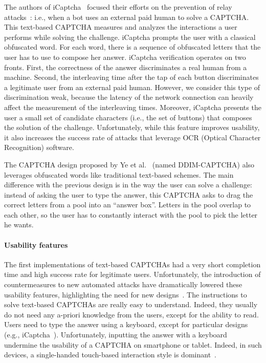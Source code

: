 \documentclass[conference]{IEEEtran}
\begin{document}
The authors of iCaptcha~\cite{truong2011iCAPTCHA} focused their efforts on the prevention of relay attacks~\cite{motoyama2010re}:
i.e., when a bot uses an external paid human to solve a CAPTCHA. This text-based CAPTCHA measures and analyzes the interactions a user performs while solving the challenge. 
iCaptcha prompts the user with a classical obfuscated word. For each word, there is a sequence of obfuscated letters that the user has to use to compose her answer.
iCaptcha verification operates on two fronts. 
First, the correctness of the answer discriminates a real human from a machine. 
Second, the interleaving time after the tap of each button discriminates a legitimate user from an external paid human.
However, we consider this type of discrimination weak, because the latency of the network connection can heavily affect the measurement of the interleaving times.
Moreover, iCaptcha presents the user a small set of candidate characters (i.e., the set of buttons) that  composes the solution of the challenge.
Unfortunately, while this feature  improves usability, it also increases the success rate of attacks that leverage OCR (Optical Character Recognition) software. 

The CAPTCHA design proposed by Ye et al.~\cite{ye2013ddim} (named DDIM-CAPTCHA) also leverages obfuscated words like traditional text-based schemes.
The main difference with the previous design is in the way the user can solve a challenge: instead of asking the user to type the answer, this CAPTCHA asks to drag the correct letters from a pool into an ``answer box''.
Letters in the pool overlap to each other, so the user has to constantly interact with the pool to pick the letter he wants. 


\paragraph{Usability features} The first implementations of text-based CAPTCHAs had a very short completion time and high success rate for legitimate users. 
Unfortunately, the introduction of countermeasures to new automated attacks have dramatically lowered these usability features, highlighting the need for new designs~\cite{fidas2011necessity}. 
The instructions to solve text-based CAPTCHAs are really easy to understand.
Indeed, they usually do not need any a-priori knowledge from the users, except for the ability to read.
Users need to type the answer using a keyboard, except for particular designs (e.g., iCaptcha~\cite{truong2011iCAPTCHA}). Unfortunately, inputting the answer with a keyboard undermine the usability of a CAPTCHA on smartphone or tablet.
Indeed, in such devices, a single-handed touch-based interaction style is dominant~\cite{posladubiquitous}. 
\end{document}
